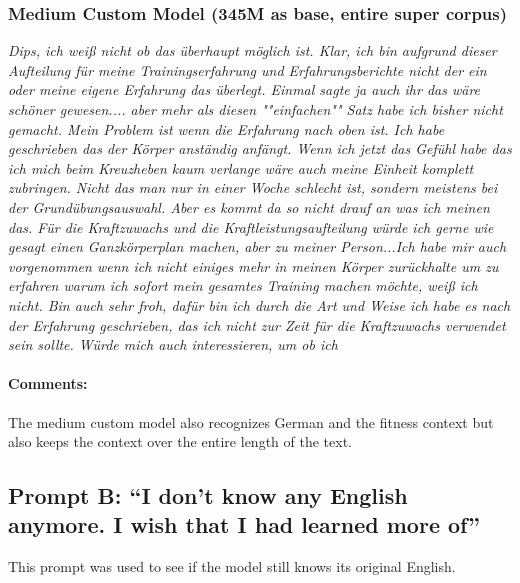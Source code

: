 \documentclass{scrartcl}
\begin{document}
\subsubsection{Medium Custom Model (345M as base, entire super corpus)}
{\itshape
 Dips, ich weiß nicht ob das überhaupt möglich ist.
Klar, ich bin aufgrund dieser Aufteilung für meine Trainingserfahrung und Erfahrungsberichte nicht der ein oder meine eigene Erfahrung das überlegt.
Einmal sagte ja auch ihr das wäre schöner gewesen.... aber mehr als diesen ""einfachen"" Satz habe ich bisher nicht gemacht.
Mein Problem ist wenn die Erfahrung nach oben ist.
Ich habe geschrieben das der Körper anständig anfängt.
Wenn ich jetzt das Gefühl habe das ich mich beim Kreuzheben kaum verlange wäre auch meine Einheit komplett zubringen.
Nicht das man nur in einer Woche schlecht ist, sondern meistens bei der Grundübungsauswahl.
Aber es kommt da so nicht drauf an was ich meinen das.
Für die Kraftzuwachs und die Kraftleistungsaufteilung würde ich gerne wie gesagt einen Ganzkörperplan machen, aber zu meiner Person...Ich habe mir auch vorgenommen wenn ich nicht einiges mehr in meinen Körper zurückhalte um zu erfahren warum ich sofort mein gesamtes Training machen möchte, weiß ich nicht.
Bin auch sehr froh, dafür bin ich durch die Art und Weise ich habe es nach der Erfahrung geschrieben, das ich nicht zur Zeit für die Kraftzuwachs verwendet sein sollte.
Würde mich auch interessieren, um ob ich
}

\paragraph{Comments:}
The medium custom model also recognizes German and the fitness context but also keeps the context over the entire length of the text.

\subsection{Prompt B: \enquote{I don't know any English anymore. I wish that I had learned more of}}
This prompt was used to see if the model still knows its original English.
\end{document}
